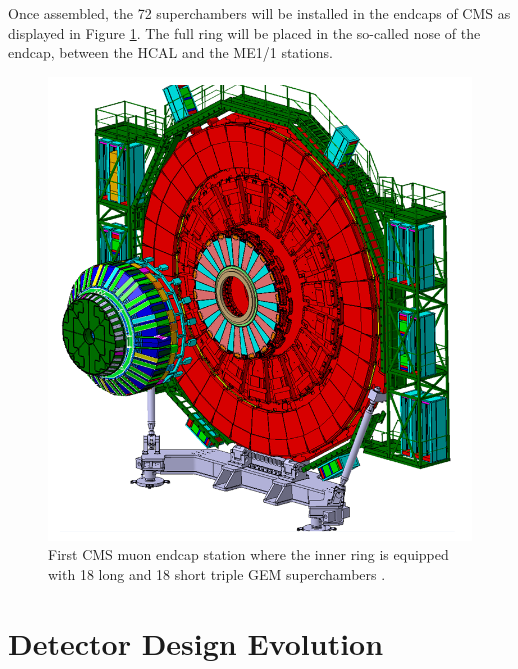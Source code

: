     Once assembled, the 72 superchambers will be installed in the endcaps of CMS as displayed in Figure \ref{fig:II-1-wheel}. The full ring will be placed in the so-called nose of the endcap, between the HCAL and the ME1/1 stations.

    \begin{figure}[p]
      \centering
      \includegraphics[width=\textwidth]{img/II-1-gem/wheel.png}
      \caption{First CMS muon endcap station where the inner ring is equipped with 18 long and 18 short triple GEM superchambers \cite{Colaleo:2021453}.}
      \label{fig:II-1-wheel}
    \end{figure}

  \section{Detector Design Evolution}

